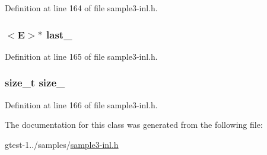 \-Definition at line 164 of file sample3-\/inl.\-h.

\hypertarget{classQueue_a558345d7686195f8fc10efa7ec0f215f}{
\subsubsection[{last\-\_\-}]{$<$\-E$>$$\ast$ {\bf last\-\_\-}}}\label{d7/d56/classQueue_a558345d7686195f8fc10efa7ec0f215f}


\-Definition at line 165 of file sample3-\/inl.\-h.

\hypertarget{classQueue_a5f31775800bbb46b35b5791def1f3acc}{
\subsubsection[{size\-\_\-}]{\setlength{\rightskip}{0pt plus 5cm}size\-\_\-t {\bf size\-\_\-}}}\label{d7/d56/classQueue_a5f31775800bbb46b35b5791def1f3acc}


\-Definition at line 166 of file sample3-\/inl.\-h.



\-The documentation for this class was generated from the following file\-:\begin{DoxyCompactItemize}
\item 
gtest-\/1../samples/\hyperlink{sample3-inl_8h}{sample3-\/inl.\-h}\end{DoxyCompactItemize}
